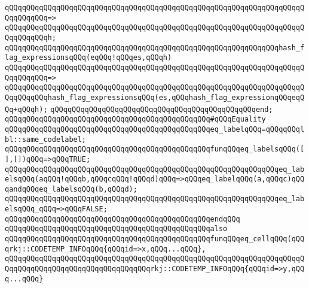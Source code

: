 \verb|qQQqqQQqqQQqqQQqqQQqqQQqqQQqqQQqqQQqqQQqqQQqqQQqqQQqqQQqqQQqqQQqqQQqqQQqqQQqqQQq=>|\newline
\verb|qQQqqQQqqQQqqQQqqQQqqQQqqQQqqQQqqQQqqQQqqQQqqQQqqQQqqQQqqQQqqQQqqQQqqQQqqQQqqQQqh;|\newline
\newline
\verb|qQQqqQQqqQQqqQQqqQQqqQQqqQQqqQQqqQQqqQQqqQQqqQQqqQQqqQQqqQQqqQQqhash_flag_expressionsqQQq(eqQQq!qQQqes,qQQqh)|\newline
\verb|qQQqqQQqqQQqqQQqqQQqqQQqqQQqqQQqqQQqqQQqqQQqqQQqqQQqqQQqqQQqqQQqqQQqqQQqqQQqqQQq=>|\newline
\verb|qQQqqQQqqQQqqQQqqQQqqQQqqQQqqQQqqQQqqQQqqQQqqQQqqQQqqQQqqQQqqQQqqQQqqQQqqQQqqQQqhash_flag_expressionsqQQq(es,qQQqhash_flag_expressionqQQqeqQQq+qQQqh);|\newline
\verb|qQQqqQQqqQQqqQQqqQQqqQQqqQQqqQQqqQQqqQQqqQQqqQQqend;|\newline
\newline
\newline
\verb|qQQqqQQqqQQqqQQqqQQqqQQqqQQqqQQqqQQqqQQqqQQqqQQq#qQQqEquality|\newline
\newline
\newline
\verb|qQQqqQQqqQQqqQQqqQQqqQQqqQQqqQQqqQQqqQQqqQQqqQQqeq_labelqQQq=qQQqqQQqlbl::same_codelabel;|\newline
\newline
\verb|qQQqqQQqqQQqqQQqqQQqqQQqqQQqqQQqqQQqqQQqqQQqqQQqfunqQQqeq_labelsqQQq([],[])qQQq=>qQQqTRUE;|\newline
\verb|qQQqqQQqqQQqqQQqqQQqqQQqqQQqqQQqqQQqqQQqqQQqqQQqqQQqqQQqqQQqqQQqeq_labelsqQQq(aqQQq!qQQqb,qQQqcqQQq!qQQqd)qQQq=>qQQqeq_labelqQQq(a,qQQqc)qQQqandqQQqeq_labelsqQQq(b,qQQqd);|\newline
\verb|qQQqqQQqqQQqqQQqqQQqqQQqqQQqqQQqqQQqqQQqqQQqqQQqqQQqqQQqqQQqqQQqeq_labelsqQQq_qQQq=>qQQqFALSE;|\newline
\verb|qQQqqQQqqQQqqQQqqQQqqQQqqQQqqQQqqQQqqQQqqQQqqQQqendqQQq|\newline
\newline
\verb|qQQqqQQqqQQqqQQqqQQqqQQqqQQqqQQqqQQqqQQqqQQqqQQqalso|\newline
\verb|qQQqqQQqqQQqqQQqqQQqqQQqqQQqqQQqqQQqqQQqqQQqqQQqfunqQQqeq_cellqQQq(qQQqrkj::CODETEMP_INFOqQQq{qQQqid=>x,qQQq...qQQq},|\newline
\verb|qQQqqQQqqQQqqQQqqQQqqQQqqQQqqQQqqQQqqQQqqQQqqQQqqQQqqQQqqQQqqQQqqQQqqQQqqQQqqQQqqQQqqQQqqQQqqQQqqQQqqQQqrkj::CODETEMP_INFOqQQq{qQQqid=>y,qQQq...qQQq}|\newline
